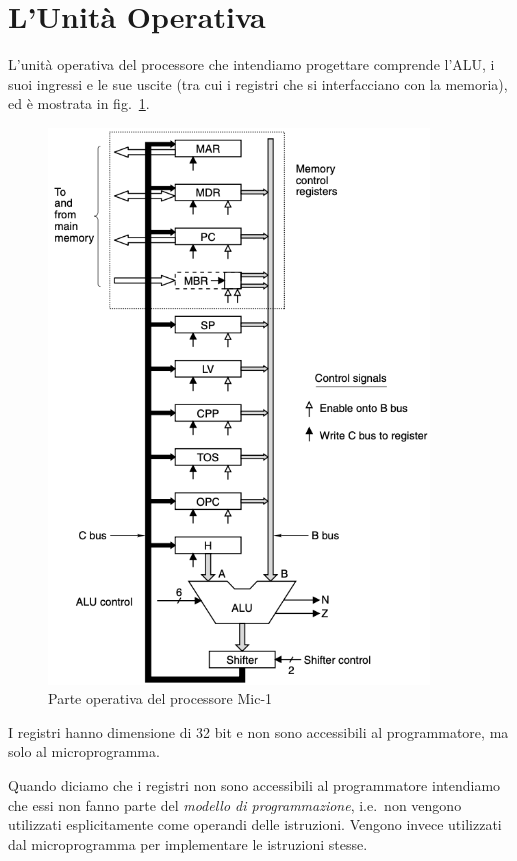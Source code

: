 \documentclass[a4paper,12pt]{scrreprt}
\begin{document}
\section{L'Unità Operativa}
L'unità operativa del processore che intendiamo progettare comprende l'ALU, i
suoi ingressi e le sue uscite (tra cui i registri che si interfacciano con la
memoria), ed è mostrata in fig.~\ref{fig:datapath}.

\begin{figure}
  \centering
  \includegraphics[width=0.9\textwidth]{datapath.png}
  \caption{Parte operativa del processore Mic-1}\label{fig:datapath}
\end{figure}

I registri hanno dimensione di 32 bit e non sono accessibili al programmatore,
ma solo al microprogramma.

\begin{mynote}{}{}
  Quando diciamo che i registri non sono accessibili al programmatore intendiamo
  che essi non fanno parte del \textit{modello di programmazione}, i.e.~non
  vengono utilizzati esplicitamente come operandi delle istruzioni. Vengono
  invece utilizzati dal microprogramma per implementare le istruzioni stesse.
\end{mynote}
\end{document}
